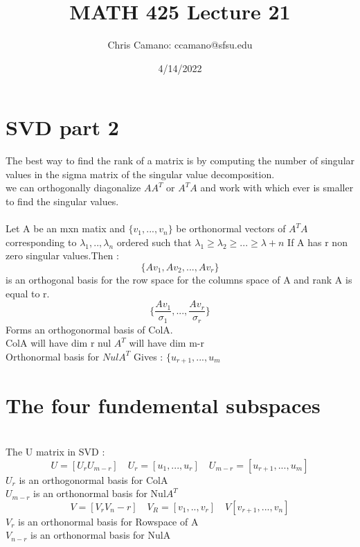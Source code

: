 \documentclass[12pt]{article}
\author{Chris Camano: ccamano@sfsu.edu}
\title{MATH 425  Lecture 21 }
\date{4/14/2022}
\newcommand{\sect}[1]{\section*{#1}}
\begin{document}
\maketitle


\sect{SVD part 2}
The best way to find the rank of a matrix is by computing the number of singular values in the sigma matrix of the singular value decomposition. \\
we can orthogonally diagonalize $AA^T$ or $A^TA$ and work with which ever is smaller to find the singular values. \\\\
Let A be an mxn matix and $\{v_1,...,v_n\}$ be orthonormal vectors of $A^TA$ corresponding to $\lambda_1,..,\lambda_n$ ordered such that $\lambda_1\geq \lambda_2\geq...\geq \lambda+n$ If A has r non zero singular values.Then :
\[
  \{Av_1,Av_2,...,Av_r\}
\]
is an orthogonal basis for the row space for the columns space of A and rank A is equal to r. \\
\[
  \{\frac{Av_1}{\sigma_1},...,\frac{Av_r}{\sigma_r}\}
\]
Forms an orthogonormal basis of ColA. \\
ColA will have dim r nul $A^T$ will have dim m-r\\
Orthonormal basis for $NulA^T$ Gives : $\{u_{r+1},...,u_m$\\
\sect{The four fundemental subspaces}\\
The U matrix in SVD :
\[
  U=[U_r U_{m-r}]\quad U_r=[u_1,...,u_r]\quad U_{m-r}=[u_{r+1},...,u_m]
\]
$U_r$ is an orthogonormal basis for ColA\\
$U_{m-r}$ is an orthonormal basis for Nul$A^T$\\
\[
  V=[V_r V_n-r]\quad V_R=[v_1,..,v_r]\quad V[v_{r+1},...,v_n]
\]
$V_r$ is an orthonormal basis for Rowspace of A\\
$V_{n-r}$ is an orthonormal basis for NulA
\end{document}
